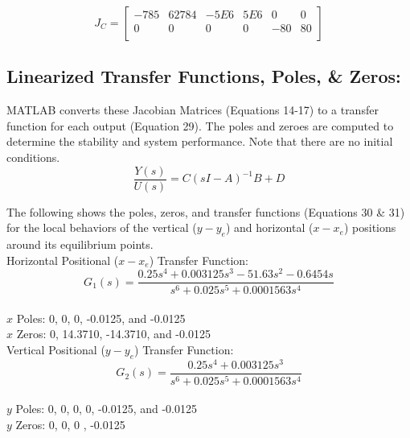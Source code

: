 \documentclass[conference]{IEEEtran}
\begin{document}
\[
J_C = 
\begin{bmatrix}
-785&62784&-5E6&5E6&0&0\\
0&0&0&0&-80&80\\
\end{bmatrix}
\tag{28}
\]
\subsection{Linearized Transfer Functions, Poles, \& Zeros:}
MATLAB converts these Jacobian Matrices (Equations 14-17) to a transfer function for each output (Equation 29).  The poles and zeroes are computed to determine the stability and system performance. Note that there are no initial conditions.
\[
 \frac{Y(s)}{U(s)} = C(sI-A)^{-1}B+D \tag{29}
\]

The following shows the poles, zeros, and transfer functions (Equations 30 \& 31) for the local behaviors of the vertical ($y - y_e$) and horizontal ($x - x_e$) positions around its equilibrium points.\\

Horizontal Positional ($x - x_e$) Transfer Function:\\
\[
G_1(s) = \frac{0.25 s^4 + 0.003125 s^3 - 51.63 s^2 - 0.6454 s}{s^6 + 0.025 s^5 + 0.0001563 s^4} \tag{30}
\]
\\
\noindent $x$ Poles: 0, 0, 0, -0.0125, and -0.0125\\
$x$ Zeros: 0, 14.3710, -14.3710, and -0.0125\\

Vertical Positional ($y - y_e$) Transfer Function:
\[
G_2(s) = \frac{0.25 s^4 + 0.003125 s^3}{s^6 + 0.025 s^5 + 0.0001563 s^4} \tag{31}
\]
\\
$y$ Poles: 0, 0, 0, 0, -0.0125, and -0.0125\\
$y$ Zeros: 0, 0, 0 , -0.0125\\
\end{document}
